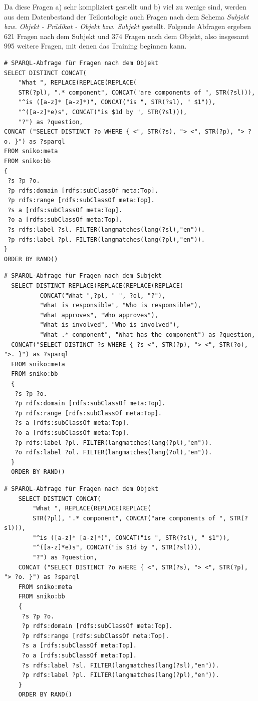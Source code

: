 \documentclass[utf8,biblatex]{lni}
\begin{document}
Da diese Fragen a) sehr kompliziert gestellt und b) viel zu wenige sind, werden aus dem Datenbestand der Teilontologie auch Fragen nach dem Schema \emph{Subjekt bzw. Objekt - Prädikat - Objekt bzw. Subjekt} gestellt.
Folgende Abfragen ergeben 621 Fragen nach dem Subjekt und 374 Fragen nach dem Objekt, also insgesamt 995 weitere Fragen, mit denen das Training beginnen kann.
\begin{lstlisting}[language=SPARQL]
# SPARQL-Abfrage für Fragen nach dem Objekt
SELECT DISTINCT CONCAT(
    "What ", REPLACE(REPLACE(REPLACE(
    STR(?pl), ".* component", CONCAT("are components of ", STR(?sl))),
    "^is ([a-z]* [a-z]*)", CONCAT("is ", STR(?sl), " $1")),
    "^([a-z]*e)s", CONCAT("is $1d by ", STR(?sl))),
    "?") as ?question,
CONCAT ("SELECT DISTINCT ?o WHERE { <", STR(?s), "> <", STR(?p), "> ?o. }") as ?sparql
FROM sniko:meta
FROM sniko:bb
{
 ?s ?p ?o.
 ?p rdfs:domain [rdfs:subClassOf meta:Top].
 ?p rdfs:range [rdfs:subClassOf meta:Top].
 ?s a [rdfs:subClassOf meta:Top].
 ?o a [rdfs:subClassOf meta:Top].
 ?s rdfs:label ?sl. FILTER(langmatches(lang(?sl),"en")).
 ?p rdfs:label ?pl. FILTER(langmatches(lang(?pl),"en")).
}
ORDER BY RAND()
\end{lstlisting}
\begin{lstlisting}[language=SPARQL]
  # SPARQL-Abfrage für Fragen nach dem Subjekt
  SELECT DISTINCT REPLACE(REPLACE(REPLACE(REPLACE(
          CONCAT("What ",?pl, " ", ?ol, "?"),
          "What is responsible", "Who is responsible"),
          "What approves", "Who approves"),
          "What is involved", "Who is involved"),
          "What .* component", "What has the component") as ?question,
  CONCAT("SELECT DISTINCT ?s WHERE { ?s <", STR(?p), "> <", STR(?o), ">. }") as ?sparql
  FROM sniko:meta
  FROM sniko:bb
  {
   ?s ?p ?o.
   ?p rdfs:domain [rdfs:subClassOf meta:Top].
   ?p rdfs:range [rdfs:subClassOf meta:Top].
   ?s a [rdfs:subClassOf meta:Top].
   ?o a [rdfs:subClassOf meta:Top].
   ?p rdfs:label ?pl. FILTER(langmatches(lang(?pl),"en")).
   ?o rdfs:label ?ol. FILTER(langmatches(lang(?ol),"en")).
  }
  ORDER BY RAND()
  \end{lstlisting}

  \begin{lstlisting}[language=SPARQL]
    # SPARQL-Abfrage für Fragen nach dem Objekt
    SELECT DISTINCT CONCAT(
        "What ", REPLACE(REPLACE(REPLACE(
        STR(?pl), ".* component", CONCAT("are components of ", STR(?sl))),
        "^is ([a-z]* [a-z]*)", CONCAT("is ", STR(?sl), " $1")),
        "^([a-z]*e)s", CONCAT("is $1d by ", STR(?sl))),
        "?") as ?question,
    CONCAT ("SELECT DISTINCT ?o WHERE { <", STR(?s), "> <", STR(?p), "> ?o. }") as ?sparql
    FROM sniko:meta
    FROM sniko:bb
    {
     ?s ?p ?o.
     ?p rdfs:domain [rdfs:subClassOf meta:Top].
     ?p rdfs:range [rdfs:subClassOf meta:Top].
     ?s a [rdfs:subClassOf meta:Top].
     ?o a [rdfs:subClassOf meta:Top].
     ?s rdfs:label ?sl. FILTER(langmatches(lang(?sl),"en")).
     ?p rdfs:label ?pl. FILTER(langmatches(lang(?pl),"en")).
    }
    ORDER BY RAND()
    \end{lstlisting}
\end{document}
